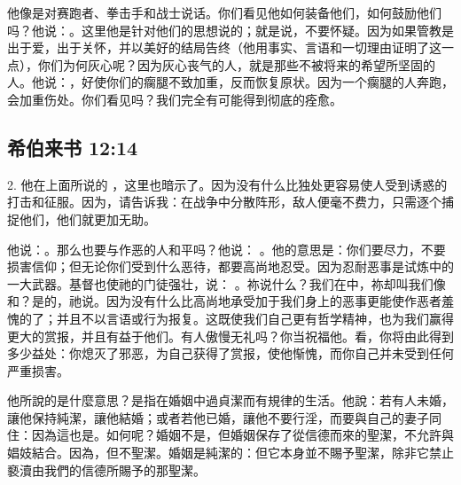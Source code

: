 他像是对赛跑者、拳击手和战士说话。你们看见他如何装备他们，如何鼓励他们吗？他说：。这里他是针对他们的思想说的；就是说，不要怀疑。因为如果管教是出于爱，出于关怀，并以美好的结局告终（他用事实、言语和一切理由证明了这一点），你们为何灰心呢？因为灰心丧气的人，就是那些不被将来的希望所坚固的人。他说：，好使你们的瘸腿不致加重，反而恢复原状。因为一个瘸腿的人奔跑，会加重伤处。你们看见吗？我们完全有可能得到彻底的痊愈。\par


\subsection{希伯来书 12:14}

2. 他在上面所说的 ，这里也暗示了。因为没有什么比独处更容易使人受到诱惑的打击和征服。因为，请告诉我：在战争中分散阵形，敌人便毫不费力，只需逐个捕捉他们，他们就更加无助。\par

他说：。那么也要与作恶的人和平吗？他说： 。他的意思是：你们要尽力，不要损害信仰；但无论你们受到什么恶待，都要高尚地忍受。因为忍耐恶事是试炼中的一大武器。基督也使祂的门徒强壮，说： 。祢说什么？我们在中，祢却叫我们像和？是的，祂说。因为没有什么比高尚地承受加于我们身上的恶事更能使作恶者羞愧的了；并且不以言语或行为报复。这既使我们自己更有哲学精神，也为我们赢得更大的赏报，并且有益于他们。有人傲慢无礼吗？你当祝福他。看，你将由此得到多少益处：你熄灭了邪恶，为自己获得了赏报，使他惭愧，而你自己并未受到任何严重损害。\par

 他所說的是什麼意思？是指在婚姻中過貞潔而有規律的生活。他說：若有人未婚，讓他保持純潔，讓他結婚；或者若他已婚，讓他不要行淫，而要與自己的妻子同住：因為這也是。如何呢？婚姻不是，但婚姻保存了從信德而來的聖潔，不允許與娼妓結合。因為，但不聖潔。婚姻是純潔的：但它本身並不賜予聖潔，除非它禁止褻瀆由我們的信德所賜予的那聖潔。\par


